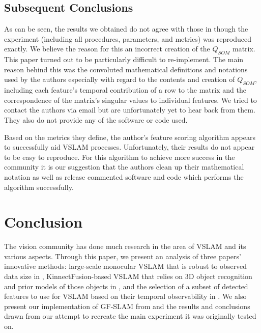 \documentclass[10pt,twocolumn,letterpaper]{article}
\begin{document}
\subsection{Subsequent Conclusions}
As can be seen, the results we obtained do not agree with those in \cite{Zhang_2015_CVPR} though the experiment (including all procedures, parameters, and metrics) was reproduced exactly. We believe the reason for this an incorrect creation of the $Q_{SOM}$ matrix. This paper turned out to be particularly difficult to re-implement. The main reason behind this was the convoluted mathematical definitions and notations used by the authors especially with regard to the contents and creation of $Q_{SOM}$, including each feature's temporal contribution of a row to the matrix and the correspondence of the matrix's singular values to individual features. We tried to contact the authors via email but are unfortunately yet to hear back from them. They also do not provide any of the software or code used.

Based on the metrics they define, the author's feature scoring algorithm appears to successfully aid VSLAM processes. Unfortunately, their results do not appear to be easy to reproduce. For this algorithm to achieve more success in the community it is our suggestion that the authors clean up their mathematical notation as well as release commented software and code which performs the algorithm successfully.    

\section{Conclusion}
The vision community has done much research in the area of VSLAM and its various aspects. Through this paper, we present an analysis of three papers' innovative methods: large-scale monocular VSLAM that is robust to observed data size in \cite{Bourmaud_2015_CVPR}, KinnectFusion-based VSLAM that relies on 3D object recognition and prior models of those objects in \cite{Salas-Moreno_2013_CVPR}, and the selection of a subset of detected features to use for VSLAM based on their temporal observability in \cite{Zhang_2015_CVPR}. We also present our implementation of GF-SLAM from \cite{Zhang_2015_CVPR} and the results and conclusions drawn from our attempt to recreate the main experiment it was originally tested on. 

{\small


}
\end{document}
